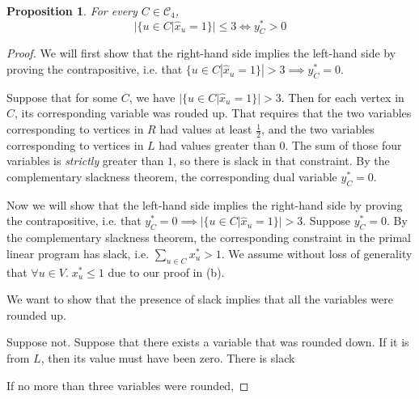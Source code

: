 \documentclass[letterpaper,11pt]{article}
\newtheorem{proposition}{Proposition}
\begin{document}
\begin{enumerate}
\begin{enumerate}
                \begin{proposition}
                    For every $C \in \mathcal{C}_4$,
                    $$
                    |\{u \in C | \hat x_u = 1\}| \leq 3 \iff y_C^* > 0
                    $$
                \end{proposition}

                \begin{proof}
                    We will first show that the right-hand side implies the
                    left-hand side by proving the contrapositive, i.e. that
                    $\{u \in C | \hat x_u = 1\}| > 3 \implies y_C^* = 0$.

                    Suppose that for some $C$, we have
                    $|\{u \in C | \hat x_u = 1\}| > 3$.
                    Then for each vertex in $C$, its corresponding variable was
                    rouded up. That requires that the two variables
                    corresponding to vertices in $R$ had values at least
                    $\frac{1}{2}$, and the two variables corresponding to
                    vertices in $L$ had values greater than $0$. The sum of
                    those four variables is \emph{strictly} greater than $1$,
                    so there is slack in that constraint. By the complementary
                    slackness theorem, the corresponding dual variable
                    $y_C^* = 0$.

                    Now we will show that the left-hand side implies the
                    right-hand side by proving the contrapositive, i.e. that
                    $y_C^* = 0 \implies |\{u \in C | \hat x_u = 1\}| > 3$.
                    Suppose $y_C^* = 0$. By the complementary slackness
                    theorem, the corresponding constraint in the primal linear
                    program has slack, i.e. $\sum_{u \in C} x_u^* > 1$. We
                    assume without loss of generality that
                    $\forall u \in V.\; x_u^* \leq 1$ due to our proof in (b).

                    We want to show that the presence of slack implies that all
                    the variables were rounded up.

                    Suppose not. Suppose that there exists a variable that was
                    rounded down. If it is from $L$, then its value must have
                    been zero. There is slack

                    If no more than three variables were rounded,


\end{proof}
\end{enumerate}
\end{enumerate}
\end{document}
